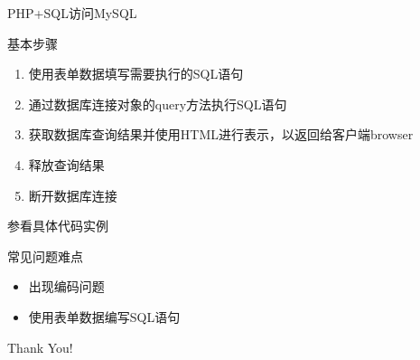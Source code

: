 \documentclass[CJK]{beamer}
\begin{document}
\begin{CJK*}{UTF8}{gbsn}
\begin{frame}{PHP+SQL访问MySQL}
\begin{block}{基本步骤}
\begin{enumerate}
	\item 使用表单数据填写需要执行的SQL语句
	\item 通过数据库连接对象的query方法执行SQL语句
	\item 获取数据库查询结果并使用HTML进行表示，以返回给客户端browser
	\item 释放查询结果
	\item 断开数据库连接
\end{enumerate}
\end{block}
{\tiny 参看具体代码实例}
\end{frame}
\begin{frame}{常见问题难点}
	\begin{itemize}
		\item 出现编码问题
		\item 使用表单数据编写SQL语句
	\end{itemize}
\end{frame}
\begin{frame}
	\begin{center}
	{\LARGE Thank You!}
	\end{center}
\end{frame}
\end{CJK*}
\end{document}
